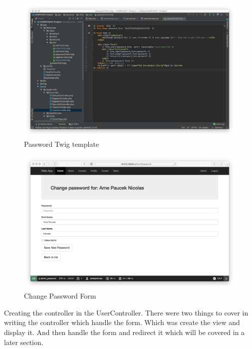 \begin{figure}[htbp]
   \centering
   \includegraphics[width=400pt]{figures/password_html_twig.png} %
   \caption{Password Twig template}
   \label{fig:Password Twig template}
\end{figure}

\begin{figure}[htbp]
   \centering
   \includegraphics[width=400pt]{figures/change_password.png} %
   \caption{Change Password Form}
   \label{fig:Change Password Form}
\end{figure}

Creating the controller in the UserController. There were two things to cover in writing the controller which handle the form. Which was create the view and display it. And then handle the form and redirect it which will be covered in a later section.

